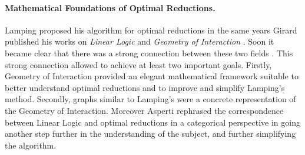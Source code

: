 \documentclass[english]{scrartcl}
\begin{document}
\paragraph{Mathematical Foundations of Optimal Reductions.}Lamping proposed his algorithm for optimal reductions in the same years Girard published his works on \emph{Linear Logic} \cite{girard_linear_1987} and \emph{Geometry of Interaction} \cite{girard_geometry_1989}. Soon it became clear that there was a strong connection between these two fields \cite{gonthier_geometry_1992,gonthier_linear_1992}. This strong connection allowed to achieve at least two important goals. Firstly, Geometry of Interaction provided an elegant mathematical framework suitable to better understand optimal reductions and to improve and simplify Lamping's method. Secondly, graphs similar to Lamping's were a concrete representation of the Geometry of Interaction. Moreover Asperti rephrased the correspondence between Linear Logic and optimal reductions in a categorical perspective in \cite{asperti_linear_1995} going another step further in the understanding of the subject, and further simplifying the algorithm.
\end{document}
